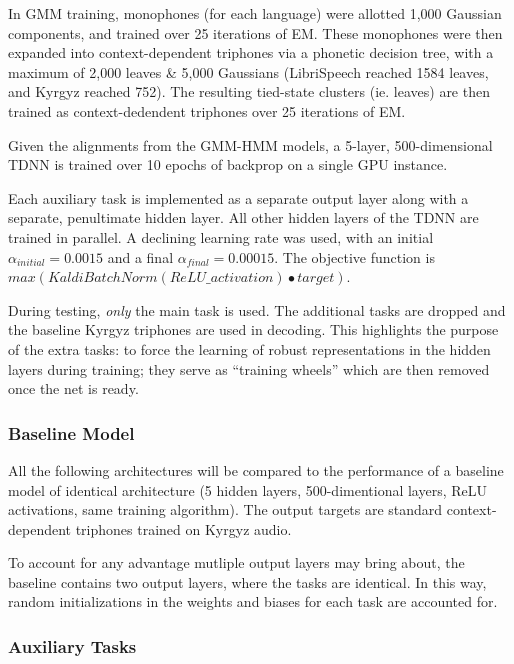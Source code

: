 \documentclass[a4paper]{article}
\begin{document}
In GMM training, monophones (for each language) were allotted 1,000 Gaussian components, and trained over 25 iterations of EM. These monophones were then expanded into context-dependent triphones via a phonetic decision tree, with a maximum of 2,000 leaves \& 5,000 Gaussians (LibriSpeech reached 1584 leaves, and Kyrgyz reached 752). The resulting tied-state clusters (ie. leaves) are then trained as context-dedendent triphones over 25 iterations of EM.

Given the alignments from the GMM-HMM models, a 5-layer, 500-dimensional TDNN is trained over 10 epochs of backprop on a single GPU instance.

Each auxiliary task is implemented as a separate output layer along with a separate, penultimate hidden layer. All other hidden layers of the TDNN are trained in parallel. A declining learning rate was used, with an initial $\alpha_{initial}=0.0015$ and a final $\alpha_{final}=0.00015$. The objective function is $max( KaldiBatchNorm(ReLU\_activation) \bullet target )$.

During testing, \textit{only} the main task is used. The additional tasks are dropped and the baseline Kyrgyz triphones are used in decoding. This highlights the purpose of the extra tasks: to force the learning of robust representations in the hidden layers during training; they serve as ``training wheels'' which are then removed once the net is ready.



\subsubsection{Baseline Model}

All the following architectures will be compared to the performance of a baseline model of identical architecture (5 hidden layers, 500-dimentional layers, ReLU activations, same training algorithm). The output targets are standard context-dependent triphones trained on Kyrgyz audio.

To account for any advantage mutliple output layers may bring about, the baseline contains two output layers, where the tasks are identical. In this way, random initializations in the weights and biases for each task are accounted for.

\subsubsection{Auxiliary Tasks}
\end{document}
